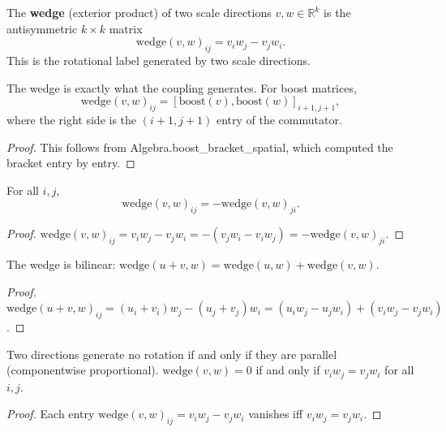 \begin{definition}
The \textbf{wedge} (exterior product) of two scale directions $v, w \in \mathbb{R}^k$ is the antisymmetric $k \times k$ matrix
\[\text{wedge}(v, w)_{ij} = v_i w_j - v_j w_i.\]
This is the rotational label generated by two scale directions.
\end{definition}

\begin{theorem}
The wedge is exactly what the coupling generates. For boost matrices,
\[\text{wedge}(v, w)_{ij} = [\text{boost}(v), \text{boost}(w)]_{i+1,j+1},\]
where the right side is the $(i+1, j+1)$ entry of the commutator.
\end{theorem}
\begin{proof}
This follows from Algebra.boost\_bracket\_spatial, which computed the bracket entry by entry.
\end{proof}

\begin{theorem}
For all $i, j$,
\[\text{wedge}(v, w)_{ij} = -\text{wedge}(v, w)_{ji}.\]
\end{theorem}
\begin{proof}
$\text{wedge}(v, w)_{ij} = v_i w_j - v_j w_i = -(v_j w_i - v_i w_j) = -\text{wedge}(v, w)_{ji}$.
\end{proof}

\begin{theorem}
The wedge is bilinear: $\text{wedge}(u + v, w) = \text{wedge}(u, w) + \text{wedge}(v, w)$.
\end{theorem}
\begin{proof}
$\text{wedge}(u + v, w)_{ij} = (u_i + v_i) w_j - (u_j + v_j) w_i = (u_i w_j - u_j w_i) + (v_i w_j - v_j w_i)$.
\end{proof}

\begin{theorem}
Two directions generate no rotation if and only if they are parallel (componentwise proportional).
$\text{wedge}(v, w) = 0$ if and only if $v_i w_j = v_j w_i$ for all $i, j$.
\end{theorem}
\begin{proof}
Each entry $\text{wedge}(v, w)_{ij} = v_i w_j - v_j w_i$ vanishes iff $v_i w_j = v_j w_i$.
\end{proof}

